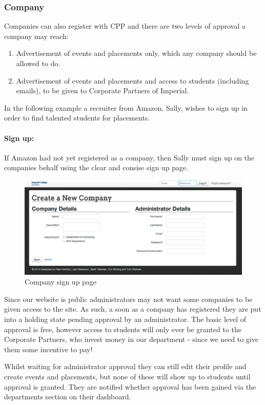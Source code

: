 \subsubsection{Company}
Companies can also register with CPP and there are two levels of approval a company may reach:
  \begin{enumerate}
    \item Advertisement of events and placements only, which any company should be allowed to do.
    \item Advertisement of events and placements and access to students (including emails), to be given to Corporate Partners of Imperial.
  \end{enumerate}
  In the following example a recruiter from Amazon, Sally, wishes to sign up in order to find talented students for placements.
  \paragraph{Sign up:}
    If Amazon had not yet registered as a company, then Sally must sign up on the companies behalf using the clear and consise sign up page.

    \begin{figure}[H]\centering
    \includegraphics[scale=0.3]{images/user_experiences/company/company_signup}
    \caption{Company sign up page}
    \end{figure}

    Since our website is public administrators may not want some companies to be given access to the site. As such, a soon as a company has registered they are put into a holding state pending approval by an administrator.
    The basic level of approval is free, however access to students will only ever be granted to the Corporate Partners, who invest money in our department - since we need to give them some incentive to pay!

    Whilst waiting for administrator approval they can still edit their profile and create events and placements, but none of these will show up to students until approval is granted. They are notified whether approval has been gained via the departments section on their dashboard.

